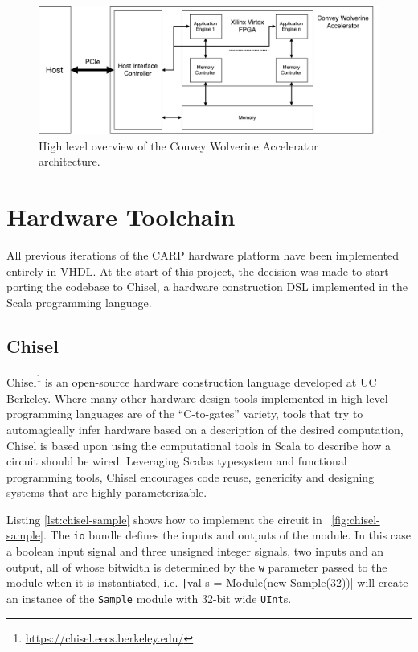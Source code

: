 \begin{figure}[ht]
  \centering
  \includegraphics[width=\linewidth]{fig/convey-wx-card}
  \caption{
    High level overview of the Convey Wolverine Accelerator architecture.
    \label{fig:convey-wx-card}
  }
\end{figure}


\section{Hardware Toolchain}

All previous iterations of the CARP hardware platform have been implemented
entirely in VHDL. At the start of this project, the decision was made to start
porting the codebase to Chisel, a hardware construction DSL implemented in the
Scala programming language.

\subsection{Chisel}

Chisel\footnote{\url{https://chisel.eecs.berkeley.edu/}} is an open-source
hardware construction language developed at UC Berkeley. Where many other
hardware design tools implemented in high-level programming languages are of the
``C-to-gates'' variety, tools that try to automagically infer hardware based on
a description of the desired computation, Chisel is based upon using the
computational tools in Scala to describe how a circuit should be wired.
Leveraging Scalas typesystem and functional programming tools, Chisel encourages
code reuse, genericity and designing systems that are highly parameterizable.

Listing \ref{lst:chisel-sample} shows how to implement the circuit in
\figurename~\ref{fig:chisel-sample}. The \texttt{io} bundle defines the inputs
and outputs of the module. In this case a boolean input signal and three
unsigned integer signals, two inputs and an output, all of whose bitwidth is
determined by the \texttt{w} parameter passed to the module when it is
instantiated, i.e. \texttt|val s = Module(new Sample(32))| will
create an instance of the \texttt{Sample} module with 32-bit wide
\texttt{UInt}s.

